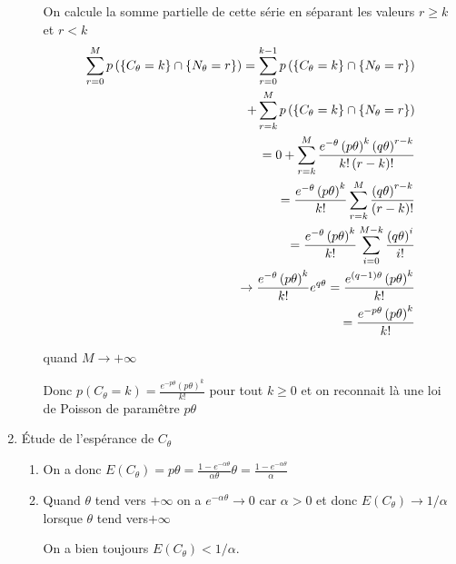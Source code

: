 \documentclass[a4paper, 11pt,reqno]{article}
\begin{document}
\begin{enumerate}
\begin{enumerate}
On calcule la somme partielle de cette s\'{e}rie en s\'{e}parant les valeurs 
$r\ge k$ et $r<k$%
\begin{eqnarray*}
\sum_{r=0}^{M}p\left( \left\{ C_{\theta }=k\right\} \cap \left\{ N_{\theta
}=r\right\} \right) =\sum_{r=0}^{k-1}p\left( \left\{ C_{\theta }=k\right\}
\cap \left\{ N_{\theta }=r\right\} \right) \\
+\sum_{r=k}^{M}p\left( \left\{ C_{\theta }=k\right\} \cap \left\{ N_{\theta
}=r\right\} \right) \\
=0+\sum_{r=k}^{M}\frac{e^{-\theta }\left( p\theta \right) ^{k}\left( q\theta
\right) ^{r-k}}{k!\left( r-k\right) !} \\
=\frac{e^{-\theta }\left( p\theta \right) ^{k}}{k!}\sum_{r=k}^{M}\frac{%
\left( q\theta \right) ^{r-k}}{\left( r-k\right) !} \\
=\frac{e^{-\theta }\left( p\theta \right) ^{k}}{k!}\sum_{i=0}^{M-k}\frac{%
\left( q\theta \right) ^{i}}{i!} \\
\rightarrow \frac{e^{-\theta }\left( p\theta \right) ^{k}}{k!}e^{q\theta }=%
\frac{e^{\left( q-1\right) \theta }\left( p\theta \right) ^{k}}{k!} \\
=\frac{e^{-p\theta }\left( p\theta \right) ^{k}}{k!}
\end{eqnarray*}

quand $M\rightarrow +\infty $

Donc $p\left( C_{\theta }=k\right) =\displaystyle
\frac{e^{-p\theta }\left( p\theta \right) ^{k}}{k!}$ pour tout $k\ge 0$ et
on reconnait l\`{a} une loi de Poisson de param\^{e}tre $p\theta $
\end{enumerate}

\item \'{E}tude de l'esp\'{e}rance de $C_{\theta }$

\begin{enumerate}
\item On a donc $E\left( C_{\theta }\right) =p\theta =\displaystyle
\frac{1-e^{-\alpha \theta }}{\alpha \theta }\theta =\frac{1-e^{-\alpha
\theta }}{\alpha }$

\item Quand $\theta $ tend vers $+\infty $ on a $e^{-\alpha \theta
}\rightarrow 0$ car $\alpha >0$ et donc $E\left( C_{\theta }\right)
\rightarrow 1/\alpha $ lorsque $\theta $ tend vers$+\infty $

On a bien toujours $E\left( C_{\theta }\right) <1/\alpha .$
\end{enumerate}
\end{enumerate}
\end{document}
